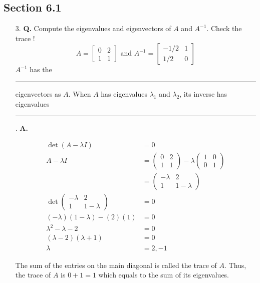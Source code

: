 \documentclass[main.tex]{subfiles}
\begin{document}
\subsection{Section 6.1}
\begin{enumerate}

    \item [3.] \textbf{Q.} Compute the eigenvalues and eigenvectors of $A$ and $A^{-1}$. Check the trace !
    $$
    A=\left[\begin{array}{ll}
    0 & 2 \\
    1 & 1
    \end{array}\right] \text { and } A^{-1}=\left[\begin{array}{rr}
    -1 / 2 & 1 \\
    1 / 2 & 0
    \end{array}\right]
    $$
    $A^{-1}$ has the \rule{1cm}{0.15mm} eigenvectors as $A$. When $A$ has eigenvalues $\lambda_{1}$ and $\lambda_{2}$, its inverse has eigenvalues \rule{1cm}{0.15mm}. \textbf{A.}

    $$
    \begin{aligned}
    \operatorname{det}(A-\lambda I) &=0 \\
    A-\lambda I &= \left(\begin{array}{ll}
    0 & 2 \\
    1 & 1
    \end{array}\right)-\lambda\left(\begin{array}{ll}
    1 & 0 \\
    0 & 1
    \end{array}\right) \\
    &=\left(\begin{array}{cc}
    -\lambda & 2 \\
    1 & 1-\lambda
    \end{array}\right)\\
    \operatorname{det}\left(\begin{array}{cc}
    -\lambda & 2 \\
    1 & 1-\lambda
    \end{array}\right) &=0 \\
    (-\lambda)(1-\lambda)-(2)(1) &=0 \\
    \lambda^{2}-\lambda-2 &=0 \\
    (\lambda-2)(\lambda+1) &=0 \\
    \lambda &=2,-1
    \end{aligned}
    $$

    The sum of the entries on the main diagonal is called the trace of $A$. Thus, the trace of $A$ is $0+1=1$ which equals to the sum of its eigenvalues.


\end{enumerate}
\end{document}

